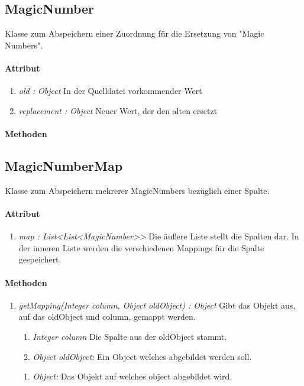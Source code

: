 \subsection{MagicNumber}
Klasse zum Abspeichern einer Zuordnung für die Ersetzung von \string"Magic Numbers\string".

\paragraph{Attribut}
\begin{enumerate}[-]
\item \textit{old : Object} In der Quelldatei vorkommender Wert
\item \textit{replacement : Object} Neuer Wert, der den alten ersetzt
\end{enumerate}
\paragraph{Methoden}

\subsection{MagicNumberMap}
Klasse zum Abspeichern mehrerer MagicNumbers bezüglich einer Spalte.

\paragraph{Attribut}
\begin{enumerate}[-]
	\item \textit{map : List<List<MagicNumber>{}>} Die äußere Liste stellt die Spalten dar. In der inneren Liste werden die verschiedenen Mappings für die Spalte gespeichert.
\end{enumerate}

\paragraph{Methoden}
\begin{enumerate}[+]
	\item \textit{getMapping(Integer column, Object oldObject) : Object} Gibt das Objekt aus, auf das oldObject und column, gemappt werden.
	
	\begin{enumerate}[$\bullet$]
		\item \textit{Integer column} Die Spalte aus der oldObject stammt.
		\item \textit{Object oldObject:} Ein Object welches abgebildet werden soll.
	\end{enumerate}
	\vspace{-0.2cm}
	\begin{enumerate}[$\circ$]
		\item \textit{Object:} Das Objekt auf welches object abgebildet wird.
	\end{enumerate}
\end{enumerate}